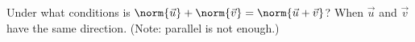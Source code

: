{Under what conditions is $\norm{\vec u}+\norm{\vec v} = \norm{\vec u+\vec v}$?
}
{When $\vec u$ and $\vec v$ have the same direction. (Note: parallel is not enough.)}
